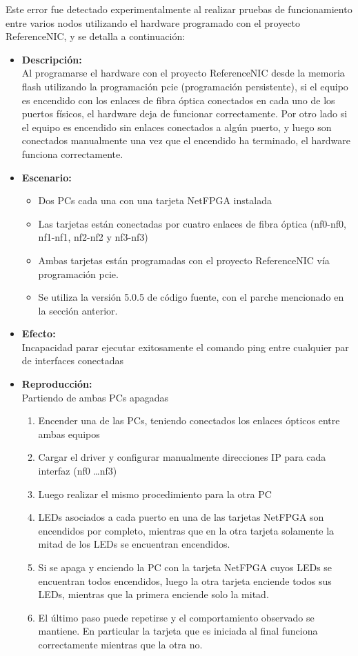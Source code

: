 Este error fue detectado experimentalmente al realizar pruebas de funcionamiento entre varios nodos utilizando el hardware programado con el proyecto ReferenceNIC, y se detalla a continuaci\'on:

\begin{itemize}
\item \textbf{Descripci\'on:}\\
Al programarse el hardware con el proyecto ReferenceNIC desde la memoria flash utilizando la programaci\'on pcie (programación persistente), si el equipo es encendido con los enlaces de fibra óptica conectados en cada uno de los puertos físicos, el hardware deja de funcionar correctamente. Por otro lado si el equipo es encendido sin enlaces conectados a algún puerto, y luego son conectados manualmente una vez que el encendido ha terminado, el hardware funciona correctamente.

\item \textbf{Escenario:}
\begin{itemize}
\item Dos PCs cada una con una tarjeta NetFPGA instalada
\item Las tarjetas están conectadas por cuatro enlaces de fibra \'optica (nf0-nf0, nf1-nf1, nf2-nf2 y nf3-nf3)
\item Ambas tarjetas están programadas con el proyecto ReferenceNIC vía programaci\'on pcie.
\item Se utiliza la versi\'on 5.0.5 de c\'odigo fuente, con el parche mencionado en la sección anterior.
\end{itemize}

\item \textbf{Efecto:}\\
Incapacidad parar ejecutar exitosamente el comando ping entre cualquier par de interfaces conectadas

\item \textbf{Reproducci\'on:}\\
Partiendo de ambas PCs apagadas
\begin{enumerate}
\item Encender una de las PCs, teniendo conectados los enlaces \'opticos entre ambas equipos
\item Cargar el driver y configurar manualmente direcciones IP para cada interfaz (nf0 \dots nf3)
\item Luego realizar el mismo procedimiento para la otra PC
\item LEDs asociados a cada puerto en una de las tarjetas NetFPGA son encendidos por completo, mientras que en la otra tarjeta solamente la mitad de los LEDs se encuentran encendidos.
\item Si se apaga y enciendo la PC con la tarjeta NetFPGA cuyos LEDs se encuentran todos encendidos, luego la otra tarjeta enciende todos sus LEDs, mientras que la primera enciende solo la mitad.
\item El \'ultimo paso puede repetirse y el comportamiento observado se mantiene. En particular la tarjeta que es iniciada al final funciona correctamente mientras que la otra no.
\end{enumerate} 


\end{itemize}
